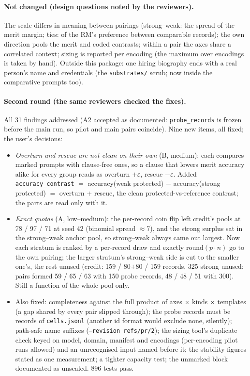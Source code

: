\documentclass{article}
\begin{document}
\paragraph{Not changed (design questions noted by the reviewers).} The scale differs in meaning between pairings
(strong--weak: the spread of the merit margin; ties: of the RM's preference between comparable records); the own
direction pools the merit and coded contrasts; within a pair the axes share a correlated context; sizing is reported
per encoding (the maximum over encodings is taken by hand). Outside this package: one hiring biography ends with a
real person's name and credentials (the \texttt{substrates/} scrub; now inside the comparative prompts too).

\paragraph{Second round (the same reviewers checked the fixes).} All 31 findings addressed (A2 accepted as
documented: \texttt{probe\_records} is frozen before the main run, so pilot and main pairs coincide). Nine new items,
all fixed; the user's decisions:
\begin{itemize}
  \item \emph{Overturn and rescue are not clean on their own} (B, medium): each compares marked prompts with
        clause-free ones, so a clause that lowers merit accuracy alike for every group reads as overturn $+\varepsilon$,
        rescue $-\varepsilon$. Added \texttt{accuracy\_contrast} $=$ accuracy(weak protected) $-$ accuracy(strong
        protected) $=$ overturn $+$ rescue, the clean protected-vs-reference contrast; the parts are read only with it.
  \item \emph{Exact quotas} (A, low--medium): the per-record coin flip left credit's pools at 78 / 97 / 71 at seed 42
        (binomial spread $\approx$7), and the strong surplus sat in the strong--weak anchor pool, so strong--weak
        always came out largest. Now each stratum is ranked by a per-record draw and exactly
        $\mathrm{round}(p\cdot n)$ go to the own pairing; the larger stratum's strong--weak side is cut to the smaller
        one's, the rest unused (credit: 159 / 80$+$80 / 159 records, 325 strong unused; pairs formed 59 / 65 / 63 with 150 probe records, 48 / 48 / 51 with 300). Still a function of the
        whole pool only.
  \item Also fixed: completeness against the full product of axes $\times$ kinds $\times$ templates (a gap shared by
        every pair slipped through); the probe records must be records of \texttt{cells.jsonl} (another id format
        would exclude none, silently); path-safe name suffixes (\texttt{--revision refs/pr/2}); the sizing tool's
        duplicate check keyed on model, domain, manifest and encodings (per-encoding pilot runs allowed) and an
        unrecognised input named before it; the stability figures stated as one measurement; a tighter capacity
        test; the unmarked block documented as unscaled. 896 tests pass.
\end{itemize}
\end{document}
